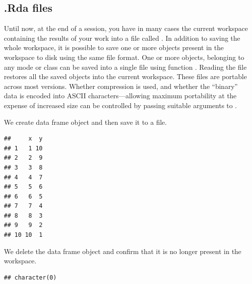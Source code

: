 \documentclass[krantz2]{krantz}\usepackage{knitr}%
\begin{document}
\subsection{.Rda files}\label{sec:data:rda}

Until now, at the end of a session, you have in many cases the current workspace containing the results of your work into a file called . In addition to saving the whole workspace, it is possible to save one or more \Rlang objects present in the workspace to disk using the same file format. One or more objects, belonging to any mode or class can be saved into a single file using function . Reading the file restores all the saved objects into the current workspace. These files are portable across most \Rlang versions. Whether compression is used, and whether the ``binary'' data is encoded into ASCII characters---allowing maximum portability at the expense of increased size can be controlled by passing suitable arguments to .

We create data frame object and then save it to a file.

\begin{knitrout}\footnotesize
{}\color{fgcolor}\begin{kframe}
\begin{alltt}
 \hlkwb{<-} \hlstd{(} \hlstd{=} \hlopt{:}\hlstd{,}  \hlstd{=} \hlopt{:}\hlstd{)}
\end{alltt}
\begin{verbatim}
##     x  y
## 1   1 10
## 2   2  9
## 3   3  8
## 4   4  7
## 5   5  6
## 6   6  5
## 7   7  4
## 8   8  3
## 9   9  2
## 10 10  1
\end{verbatim}
\begin{alltt}
  \hlstd{=} \hlstd{)}
\end{alltt}
\end{kframe}
\end{knitrout}

We delete the data frame object and confirm that it is no longer present in the workspace.
\begin{knitrout}\footnotesize
{}\color{fgcolor}\begin{kframe}
\begin{alltt}
\hlstd{(} \hlstd{=} \hlstd{)}
\end{alltt}
\begin{verbatim}
## character(0)
\end{verbatim}
\end{kframe}
\end{knitrout}
\end{document}
